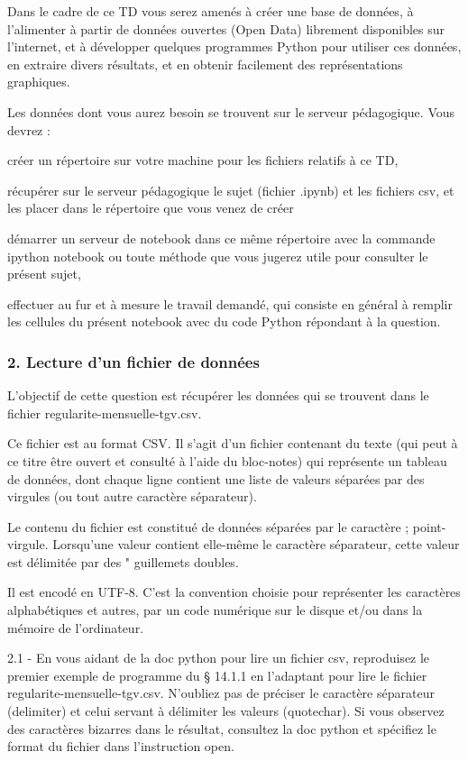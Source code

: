 \documentclass{article}
\begin{document}
    Dans le cadre de ce TD vous serez amenés à créer une base de données, à
l'alimenter à partir de données ouvertes (Open Data) librement
disponibles sur l'internet, et à développer quelques programmes Python
pour utiliser ces données, en extraire divers résultats, et en obtenir
facilement des représentations graphiques.

    Les données dont vous aurez besoin se trouvent sur le serveur
pédagogique. Vous devrez :

créer un répertoire sur votre machine pour les fichiers relatifs à ce
TD,

récupérer sur le serveur pédagogique le sujet (fichier .ipynb) et les
fichiers csv, et les placer dans le répertoire que vous venez de créer

démarrer un serveur de notebook dans ce même répertoire avec la commande
ipython notebook ou toute méthode que vous jugerez utile pour consulter
le présent sujet,

effectuer au fur et à mesure le travail demandé, qui consiste en général
à remplir les cellules du présent notebook avec du code Python répondant
à la question.

    \subsubsection{2. Lecture d'un fichier de
données}\label{lecture-dun-fichier-de-donnuxe9es}

    L'objectif de cette question est récupérer les données qui se trouvent
dans le fichier regularite-mensuelle-tgv.csv.

Ce fichier est au format CSV. Il s'agit d'un fichier contenant du texte
(qui peut à ce titre être ouvert et consulté à l'aide du bloc-notes) qui
représente un tableau de données, dont chaque ligne contient une liste
de valeurs séparées par des virgules (ou tout autre caractère
séparateur).

Le contenu du fichier est constitué de données séparées par le caractère
; point-virgule. Lorsqu'une valeur contient elle-même le caractère
séparateur, cette valeur est délimitée par des " guillemets doubles.

Il est encodé en UTF-8. C'est la convention choisie pour représenter les
caractères alphabétiques et autres, par un code numérique sur le disque
et/ou dans la mémoire de l'ordinateur.

    2.1 - En vous aidant de la doc python pour lire un fichier csv,
reproduisez le premier exemple de programme du § 14.1.1 en l'adaptant
pour lire le fichier regularite-mensuelle-tgv.csv. N'oubliez pas de
préciser le caractère séparateur (delimiter) et celui servant à
délimiter les valeurs (quotechar). Si vous observez des caractères
bizarres dans le résultat, consultez la doc python et spécifiez le
format du fichier dans l'instruction open.
\end{document}
